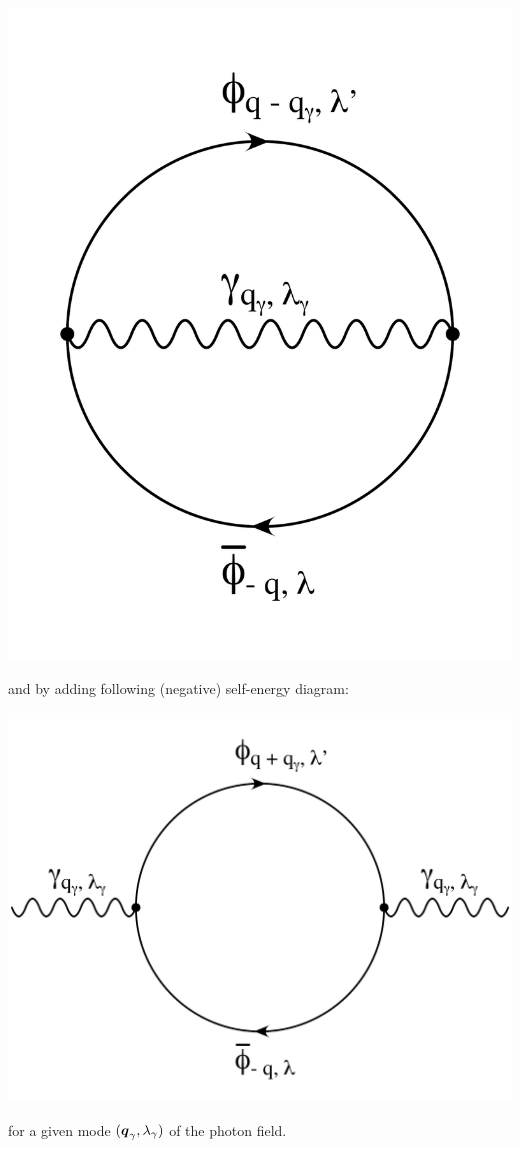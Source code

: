 \documentclass[10pt,a4paper,twoside,openany]{book}
\begin{document}
\begin{center}
\includegraphics[scale=0.2]{images/diagrams/Photon_Energy_2a.pdf}
\end{center}
and by adding following (negative) self-energy diagram:
\begin{center}
\includegraphics[scale=0.24]{images/diagrams/Photon_Energy_2b.pdf}
\end{center}
for a given mode $(\boldsymbol{q}_\gamma, \lambda_\gamma)$ of the photon field.
\end{document}
